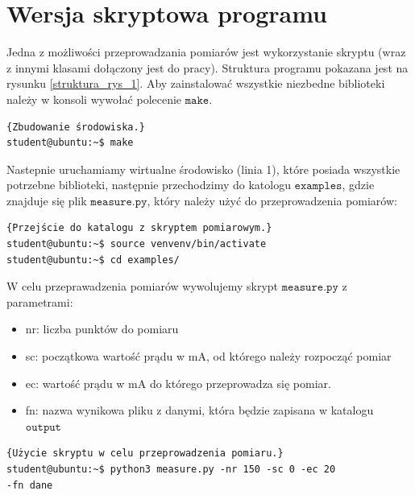 \section{Wersja skryptowa programu}
Jedna z możliwości przeprowadzania pomiarów jest wykorzystanie skryptu (wraz z innymi klasami dołączony jest do pracy).
Struktura programu pokazana jest na rysunku \ref{struktura_rys_1}. Aby zainstalować wszystkie niezbedne biblioteki należy
w konsoli wywołać polecenie $\mathtt{make}$.
\begin{lstlisting}[style=Bash]{Zbudowanie środowiska.}
student@ubuntu:~$ make
\end{lstlisting}
Nastepnie uruchamiamy wirtualne środowisko (linia 1), które posiada wszystkie potrzebne biblioteki, następnie
przechodzimy do katologu $\mathtt{examples}$, gdzie znajduje się plik $\mathtt{measure.py}$, który należy użyć do
przeprowadzenia pomiarów:
\begin{lstlisting}[style=Bash]{Przejście do katalogu z skryptem pomiarowym.}
student@ubuntu:~$ source venvenv/bin/activate
student@ubuntu:~$ cd examples/
\end{lstlisting}
W celu przeprawadzenia pomiarów wywolujemy skrypt $\mathtt{measure.py}$ z parametrami:
\begin{itemize}
\item nr: liczba punktów do pomiaru
\item sc: początkowa wartość prądu w mA, od którego należy rozpocząć pomiar
\item ec: wartość prądu w mA do którego przeprowadza się pomiar.
\item fn: nazwa wynikowa pliku z danymi, która będzie zapisana w katalogu $\mathtt{output}$
\end{itemize}
\begin{lstlisting}[style=Bash]{Użycie skryptu w celu przeprowadzenia pomiaru.}
student@ubuntu:~$ python3 measure.py -nr 150 -sc 0 -ec 20
-fn dane
\end{lstlisting}
